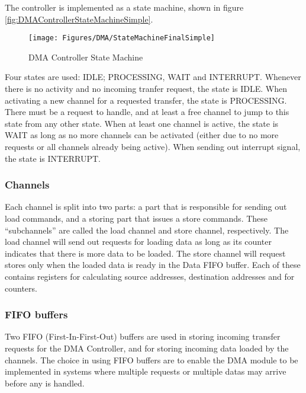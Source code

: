 The controller is implemented as a state machine, shown in figure \ref{fig:DMAControllerStateMachineSimple}.

\begin{figure}[htb]
    \centering
    \texttt{[image: Figures/DMA/StateMachineFinalSimple]}
    \caption{DMA Controller State Machine}
    \label{fig:DMAControllerStateMachineSimple2}
\end{figure}

Four states are used: IDLE; PROCESSING, WAIT and INTERRUPT.
Whenever there is no activity and no incoming tranfer request, the state is IDLE.
When activating a new channel for a requested transfer, the state is PROCESSING. There must be a request to handle, and at least a free channel to jump to this state from any other state.
When at least one channel is active, the state is WAIT as long as no more channels can be activated (either due to no more requests or all channels already being active).
When sending out interrupt signal, the state is INTERRUPT.

\subsubsection{Channels}
Each channel is split into two parts: a part that is responsible for sending out load
commands, and a storing part that issues a store commands. These ``subchannels''
are called the load channel and store channel, respectively.
The load channel will send out requests for loading data as long as its counter indicates that there is more data to be loaded. The store channel will request stores only when the loaded data is ready in the Data FIFO buffer.
Each of these contains registers for calculating source addresses, destination addresses and for counters.

\subsubsection{FIFO buffers}
Two FIFO (First-In-First-Out) buffers are used in storing incoming transfer requests for the DMA Controller, and for storing incoming data loaded by the channels.
The choice in using FIFO buffers are to enable the DMA module to be implemented in systems where multiple requests or multiple datas may arrive before any is handled.

